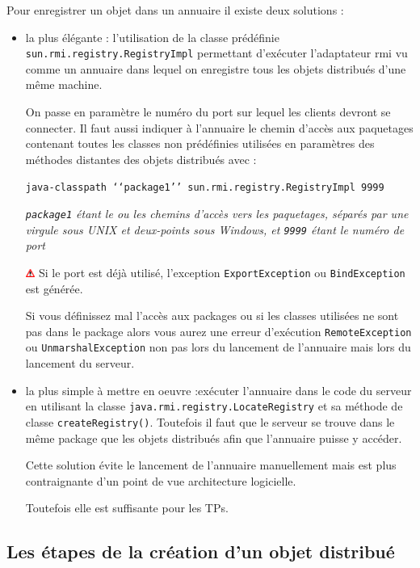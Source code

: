 \documentclass[a4paper,11pt]{report}
\newcommand{\attention}[1]{
	\begin{center}
	\medskip
	\colorbox{attention}{
		\begin{minipage}{0.8\textwidth}\medskip\includegraphics[height=10px]{images/attention.png} #1 \medskip\end{minipage}
	}
	\medskip
	\end{center}
}
\begin{document}
Pour enregistrer un objet dans un annuaire il existe deux solutions :
\begin{itemize}
\item la plus élégante : l\rq{}utilisation de la classe prédéfinie \texttt{sun.rmi.registry.RegistryImpl} permettant d\rq{}exécuter l\rq{}adaptateur rmi vu comme un annuaire dans lequel on enregistre tous les objets distribués d\rq{}une même machine.

On passe en paramètre le numéro du port sur lequel les clients devront se connecter. Il faut aussi indiquer à l\rq{}annuaire le chemin d\rq{}accès aux paquetages contenant toutes les classes non prédéfinies utilisées en paramètres des méthodes distantes des objets distribués avec :

\texttt{java-classpath \lq\lq{}package1\rq\rq{} sun.rmi.registry.RegistryImpl 9999}

\textit{\texttt{package1} étant le ou les chemins d\rq{}accès vers les paquetages, séparés par une virgule sous UNIX et deux-points sous Windows, et \texttt{9999} étant le numéro de port}
\attention{Si le port est déjà utilisé, l\rq{}exception \texttt{ExportException} ou \texttt{BindException} est générée.

Si vous définissez mal l\rq{}accès aux packages ou si les classes utilisées ne sont pas dans le package alors vous aurez une erreur d\rq{}exécution \texttt{RemoteException} ou \texttt{UnmarshalException} non pas lors du lancement de l\rq{}annuaire mais lors du lancement du serveur.}

\item la plus simple à mettre en oeuvre :exécuter l\rq{}annuaire dans le code du serveur en utilisant la classe \texttt{java.rmi.registry.LocateRegistry} et sa méthode de classe \texttt{createRegistry()}. Toutefois il faut que le serveur se trouve dans le même package que les objets distribués afin que l\rq{}annuaire puisse y accéder.

Cette solution évite le lancement de l\rq{}annuaire manuellement mais est plus contraignante d\rq{}un point de vue architecture logicielle.

Toutefois elle est suffisante pour les TPs.
\end{itemize}

\newpage

\subsection{Les étapes de la création d\rq{}un objet distribué}
\end{document}
